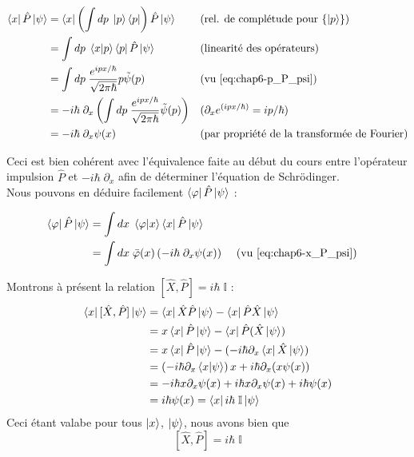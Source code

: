 \documentclass[../notesdecours]{subfiles}
\begin{document}
\begin{align}
	\bra{x}\hat{P}\ket{\psi} &= \bra{x} \left( \int dp \; \ket{p} \bra{p} \right) \hat{P} \ket{\psi} && (\text{rel. de complétude pour $\{\ket p\}$}) \notag\\
	&= \int dp \; \braket{x|p} \bra{p}\hat{P}\ket{\psi} && \text{(linearité des opérateurs)} \notag\\
	&= \int dp \; \frac{e^{ipx/\hbar}}{\sqrt{2\pi \hbar}} p \tilde{\psi}(p) && \text{(vu \eqref{eq:chap6-p_P_psi})} \notag\\
	&= -i \hbar \; \partial_x \left(\int dp \; \frac{e^{ipx/\hbar}}{\sqrt{2 \pi \hbar}} \tilde{\psi}(p) \right) && (\partial_x e^{(ipx/\hbar)}= ip/\hbar)\notag\\
	&= -i \hbar \; \partial_x \psi(x) && \text{(par propriété de la transformée de Fourier)} \label{eq:chap6-x_P_psi}
\end{align}

Ceci est bien cohérent avec l'équivalence faite au début du cours entre l'opérateur impulsion $\hat{P}$ et $-i\hbar \; \partial_x$ afin de déterminer l'équation de Schrödinger. \\
Nous pouvons en déduire facilement $\bra{\varphi} \hat{P} \ket{\psi}$ : 

\begin{align}
    \bra{\varphi} \hat{P} \ket{\psi} &= \int dx \; \braket{\varphi | x} \bra{x} \hat{P} \ket{\psi} \notag \\
	&= \int dx \; \bar\varphi(x) \left( -i\hbar \; \partial_x \psi(x) \right) && \text{ (vu \eqref{eq:chap6-x_P_psi})} 
\end{align}

Montrons à présent la relation $[\hat{X}, \hat{P}] = i\hbar \; \mathbb{I}$ : 
\begin{align}
    \bra{x}[\hat{X}, \hat{P}] \ket{\psi} &= \bra{x} \hat{X}\hat{P}\ket{\psi} - \bra{x} \hat{P}\hat{X}\ket{\psi} \notag \\
    &= x \bra{x}\hat{P}\ket{\psi} - \bra{x}\hat{P}(\hat{X}\ket{\psi})\notag \\
	&= x \bra{x}\hat{P}\ket{\psi} - ( -i\hbar \partial_x \bra{x}\hat{X}\ket{\psi} ) \notag \\
    &= \left( -i\hbar \partial_x \braket{x|\psi} \right) x + i\hbar \partial_x (x \psi(x)) \notag \\
    &= -i\hbar x \partial_x \psi(x) + i\hbar x\partial_x \psi(x) + i\hbar \psi(x) \notag \\
    &= i\hbar \psi(x) = \bra{x} i\hbar \; \mathbb{I}\ket{\psi} 
\end{align}
Ceci étant valabe pour tous $\ket{x}$, $\ket{\psi}$, nous avons bien que 
\begin{equation}\label{eq:chap6-commut_X_P}
     [\hat{X}, \hat{P}] = i\hbar \; \mathbb{I}
\end{equation} 
\end{document}
